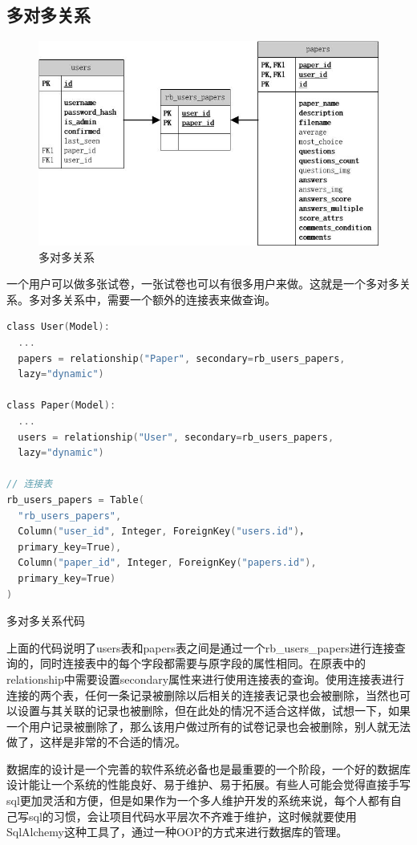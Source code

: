 \subsection{多对多关系}

\begin{figure}[thbp!]
	\centering
	\includegraphics[width=1.0\linewidth]{figure/rb_users_papers}
	\caption{多对多关系}
	\label{fig:rb_users_papers}
\end{figure}

一个用户可以做多张试卷，一张试卷也可以有很多用户来做。这就是一个多对多关系。多对多关系中，需要一个额外的连接表来做查询。

\begin{lstlisting}[language=C]
class User(Model):
  ...
  papers = relationship("Paper", secondary=rb_users_papers,
  lazy="dynamic")

class Paper(Model):
  ...
  users = relationship("User", secondary=rb_users_papers,
  lazy="dynamic")

// 连接表
rb_users_papers = Table(
  "rb_users_papers",
  Column("user_id", Integer, ForeignKey("users.id")，
  primary_key=True),
  Column("paper_id", Integer, ForeignKey("papers.id"),
  primary_key=True)
)
\end{lstlisting}

\begin{center}
	{\small 多对多关系代码}
\end{center}

上面的代码说明了users表和papers表之间是通过一个rb\_users\_papers进行连接查询的，同时连接表中的每个字段都需要与原字段的属性相同。在原表中的relationship中需要设置secondary属性来进行使用连接表的查询。使用连接表进行连接的两个表，任何一条记录被删除以后相关的连接表记录也会被删除，当然也可以设置与其关联的记录也被删除，但在此处的情况不适合这样做，试想一下，如果一个用户记录被删除了，那么该用户做过所有的试卷记录也会被删除，别人就无法做了，这样是非常的不合适的情况。

数据库的设计是一个完善的软件系统必备也是最重要的一个阶段，一个好的数据库设计能让一个系统的性能良好、易于维护、易于拓展。有些人可能会觉得直接手写sql更加灵活和方便，但是如果作为一个多人维护开发的系统来说，每个人都有自己写sql的习惯，会让项目代码水平层次不齐难于维护，这时候就要使用SqlAlchemy这种工具了，通过一种OOP的方式来进行数据库的管理。
